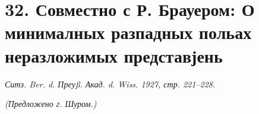 \documentclass[11pt]{article}
\begin{document}

\setcounter{footnote}{0}

\section*{32. Совместно с Р. Брауером: О минималных разпадных польах неразложимых представјень}
\begin{center}
\emph{Ситз. Ber. d. Преуß. Акад. d. Wiss. 1927, стр. 221--228.}
\end{center}

\begin{center}\emph{(Предложено г. Шуром.)}\end{center}
\end{document}
